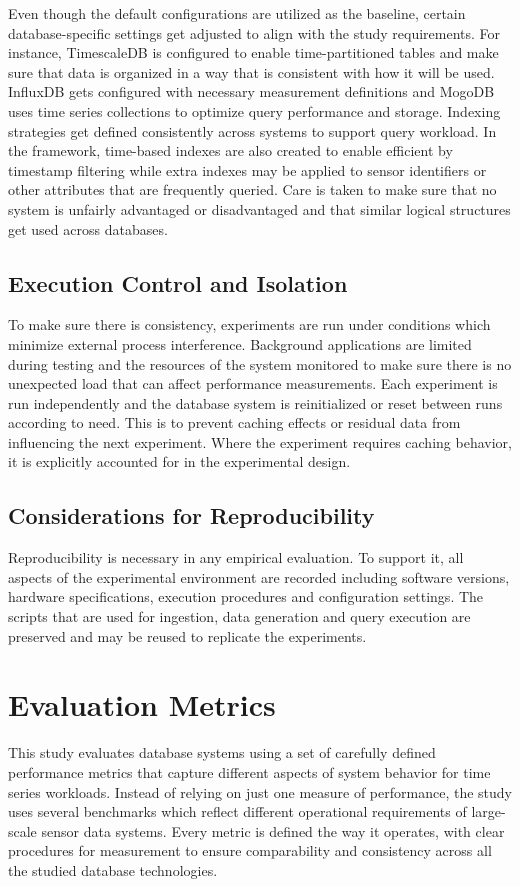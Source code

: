 Even though the default configurations are utilized as the baseline, certain database-specific settings get adjusted to align with the study requirements. For instance, TimescaleDB is configured to enable time-partitioned tables and make sure that data is organized in a way that is consistent with how it will be used. InfluxDB gets configured with necessary measurement definitions and MogoDB uses time series collections to optimize query performance and storage. Indexing strategies get defined consistently across systems to support query workload. In the framework, time-based indexes are also created to enable efficient by timestamp filtering while extra indexes may be applied to sensor identifiers or other attributes that are frequently queried. Care is taken to make sure that no system is unfairly advantaged or disadvantaged and that similar logical structures get used across databases. 

\subsection{Execution Control and Isolation}
To make sure there is consistency, experiments are run under conditions which minimize external process interference. Background applications are limited during testing and the resources of the system monitored to make sure there is no unexpected load that can affect performance measurements. Each experiment is run independently and the database system is reinitialized or reset between runs according to need. This is to prevent caching effects or residual data from influencing the next experiment. Where the experiment requires caching behavior, it is explicitly accounted for in the experimental design. 


\subsection{Considerations for Reproducibility}
Reproducibility is necessary in any empirical evaluation. To support it, all aspects of the experimental environment are recorded including software versions, hardware specifications, execution procedures and configuration settings. The scripts that are used for ingestion, data generation and query execution are preserved and may be reused to replicate the experiments. 





\section{Evaluation Metrics}
This study evaluates database systems using a set of carefully defined performance metrics that capture different aspects of system behavior for time series workloads. Instead of relying on just one measure of performance, the study uses several benchmarks which reflect different operational requirements of large-scale sensor data systems. Every metric is defined the way it operates, with clear procedures for measurement to ensure comparability and consistency across all the studied database technologies. 


